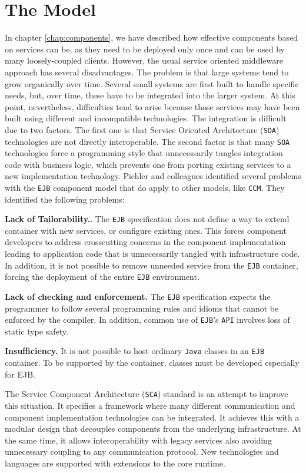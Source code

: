 \section{The Model}
In chapter \ref{chap:components}, we have described how effective components based on services can be, as they need to be deployed only
once and can be used by many loosely-coupled clients. However, the usual service oriented middleware approach has several disadvantages.
The problem is that large systems tend to grow organically over time. Several small systems are first built to handle specific needs,
but, over time, these have to be integrated into the larger system. At this point, nevertheless, difficulties tend to arise because
those services may have been built using different and incompatible technologies. The integration is difficult due to two
factors. The first one is that Service Oriented Architecture (\texttt{SOA}) technologies are not directly interoperable. The second factor is that many \texttt{SOA} technologies
force a programming style that unnecessarily tangles integration code with business logic, which prevents one from porting
existing services to a new implementation technology. Pichler and colleagues \cite{Pichler} identified several problems with the \texttt{EJB}
component model that do apply to other models, like \texttt{CCM}. They identified the following problems:

\textbf{Lack of Tailorability.}. The \texttt{EJB} specification does not define a way to extend container with new services, or configure
existing ones. This forces component developers to address crosscutting concerns in the component implementation leading to application
code that is unnecessarily tangled with infrastructure code. In addition, it is not possible to remove unneeded service from
the \texttt{EJB} container, forcing the deployment of the entire \texttt{EJB} environment. 

\textbf{Lack of checking and enforcement.} The \texttt{EJB}
specification expects the programmer to follow several programming rules and idioms that cannot be enforced by the compiler.
In addition, common use of \texttt{EJB}'s \texttt{API} involves loss of static type safety. 

\textbf{Insufficiency.} It is not possible to host
ordinary \texttt{Java} classes in an \texttt{EJB} container. To be supported by the container, classes must be developed especially for EJB.

The Service Component Architecture (\texttt{SCA}) standard is an attempt to improve this situation. It specifies a framework
where many different communication and component implementation technologies can be integrated. It achieves this
with a modular design that decouples components from the underlying infrastructure. At the same time, it allows
interoperability with legacy services also avoiding unnecessary coupling to any communication protocol. New
technologies and languages are supported with extensions to the core runtime.

